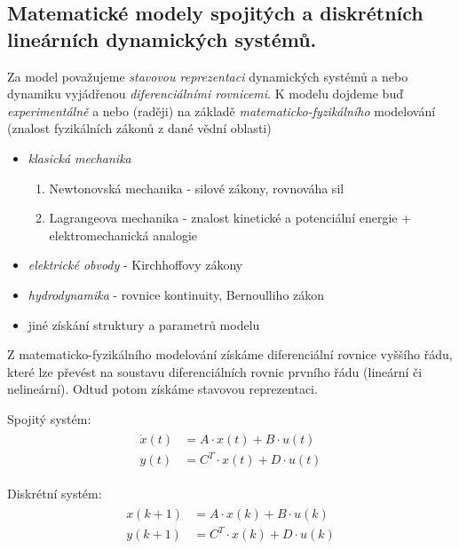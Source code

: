 \subsection{Matematické modely spojitých a diskrétních lineárních dynamických systémů.}
Za model považujeme \textit{stavovou reprezentaci} dynamických systémů a nebo dynamiku vyjádřenou \textit{diferenciálními rovnicemi}. K modelu dojdeme buď \textit{experimentálně} a nebo (raději) na základě \textit{matematicko-fyzikálního} modelování (znalost fyzikálních zákonů z dané vědní oblasti)
\begin{itemize}
\item \textit{klasická mechanika}
\begin{enumerate}[label=(\alph*)]
\item Newtonovská mechanika - silové zákony, rovnováha sil
\item Lagrangeova mechanika - znalost kinetické a potenciální energie + elektromechanická analogie
\end{enumerate}
\item \textit{elektrické obvody} - Kirchhoffovy zákony
\item \textit{hydrodynamika} - rovnice kontinuity, Bernoulliho zákon
\item jiné získání struktury a parametrů modelu
\end{itemize}

Z matematicko-fyzikálního modelování získáme diferenciální rovnice vyššího řádu, které lze převést na soustavu diferenciálních rovnic prvního řádu (lineární či nelineární). Odtud potom získáme stavovou reprezentaci.

Spojitý systém:
\begin{align}
\begin{split}
\dot{x}(t) &= A \cdot x(t) + B \cdot u(t) \\
y(t) &= C^T \cdot x(t) + D \cdot u(t)
\end{split}
\end{align}

Diskrétní systém:
\begin{align}
\begin{split}
x(k+1) &= A \cdot x(k) + B \cdot u(k) \\
y(k+1) &= C^T \cdot x(k) + D \cdot u(k)
\end{split}
\end{align}


